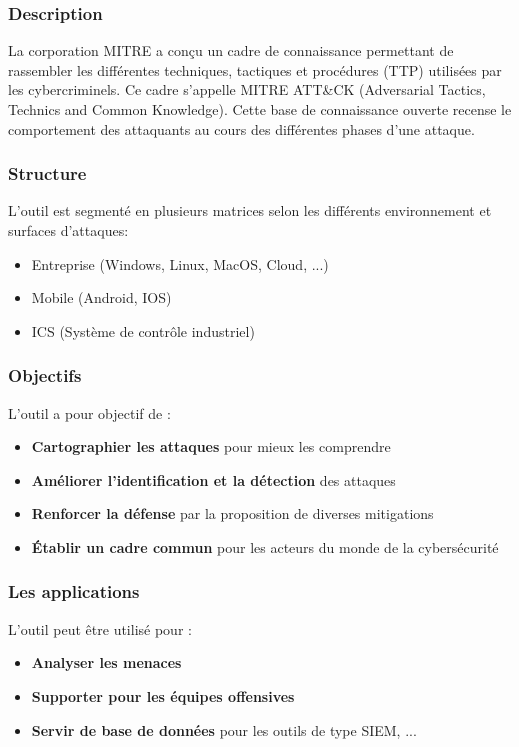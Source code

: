 \documentclass[12pt,letterpaper]{article}
\begin{document}
\subsubsection{Description}

La corporation MITRE a conçu un cadre de connaissance permettant de rassembler les différentes techniques, tactiques et procédures (TTP) utilisées par les cybercriminels. Ce cadre s'appelle MITRE ATT\&CK (Adversarial Tactics, Technics and Common Knowledge). Cette base de connaissance ouverte recense le comportement des attaquants au cours des différentes phases d'une attaque. 

\subsubsection{Structure}

L'outil est segmenté en plusieurs matrices selon les différents environnement et surfaces d'attaques:
\begin{itemize}
    \item Entreprise (Windows, Linux, MacOS, Cloud, ...)
    \item Mobile (Android, IOS)
    \item ICS (Système de contrôle industriel)
\end{itemize}

\subsubsection{Objectifs}

L'outil a pour objectif de :
\begin{itemize}
    \item \textbf{Cartographier les attaques} pour mieux les comprendre
    \item \textbf{Améliorer l'identification et la détection} des attaques
    \item \textbf{Renforcer la défense} par la proposition de diverses mitigations
    \item \textbf{Établir un cadre commun} pour les acteurs du monde de la cybersécurité
\end{itemize}

\subsubsection{Les applications}

L'outil peut être utilisé pour :
\begin{itemize}
    \item \textbf{Analyser les menaces}
    \item \textbf{Supporter pour les équipes offensives}
    \item \textbf{Servir de base de données} pour les outils de type SIEM, ...
\end{itemize}
\end{document}
